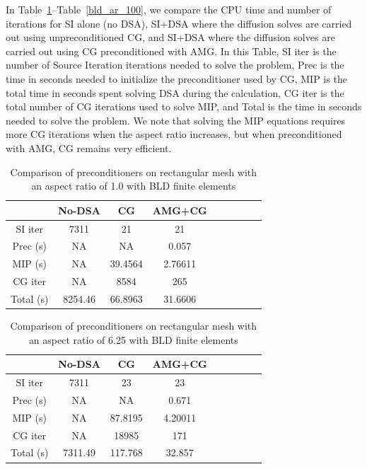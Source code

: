 \documentclass{mc2013}
\renewcommand{\(}{\left(}
\renewcommand{\)}{\right)}
\renewcommand{\[}{\left[}
\renewcommand{\]}{\right]}
\newcommand{\tbl}[1]{Table~\ref{#1}}                     %
\begin{document}
In \tbl{bld_ar_1}--\tbl{bld_ar_100}, we compare the CPU time and number of iterations for SI alone (no DSA), SI+DSA where the diffusion solves
are carried out using  unpreconditioned CG, and  SI+DSA where the diffusion solves
are carried out using  CG preconditioned with AMG.
In this Table, SI iter is the number of Source Iteration iterations 
needed to solve the problem, Prec is the time in seconds needed to
initialize the preconditioner used by CG, MIP is the total time in
seconds spent solving DSA during the calculation, CG iter is the total number 
of CG iterations used to solve MIP, and Total is the time in
seconds needed to solve the problem.
We note that solving the MIP equations requires more CG iterations when the aspect
ratio increases, but when preconditioned with AMG, CG remains very efficient. 

    \begin{table}[H]
\centering
      \caption{Comparison of preconditioners on rectangular mesh with an aspect ratio of 1.0 with BLD finite elements}
      \begin{tabular}{|c|c|c|c|c|c|c|c|c|}
        \hline
        & No-DSA & CG & AMG+CG \\
        \hline
        SI iter    & 7311    & 21      & 21      \\
        Prec (s)   & NA      & NA      & 0.057   \\
        MIP (s)    & NA      & 39.4564 & 2.76611 \\
        CG iter    & NA      & 8584    & 265     \\
        Total (s)  & 8254.46 & 66.8963 & 31.6606 \\
        \hline
      \end{tabular}
      \label{bld_ar_1}      
    \end{table}
    \begin{table}[H]
\centering
    \caption{Comparison of preconditioners on rectangular mesh with an aspect ratio of 6.25 with BLD finite elements}  
      \begin{tabular}{|c|c|c|c|c|c|c|c|c|}
        \hline
        & No-DSA & CG & AMG+CG \\
        \hline
        SI iter    & 7311    & 23      & 23      \\
        Prec (s)   & NA      & NA      & 0.671   \\
        MIP (s)    & NA      & 87.8195 & 4.20011 \\
        CG iter    & NA      & 18985   & 171     \\
        Total (s)  & 7311.49 & 117.768 & 32.857  \\
        \hline
      \end{tabular}
      \label{bld_ar_6}      
    \end{table}
\end{document}
